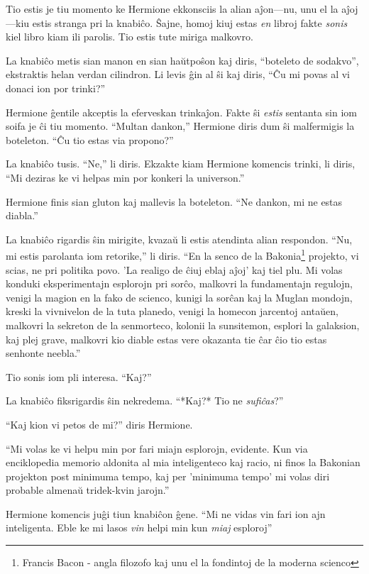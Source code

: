 Tio estis je tiu momento ke Hermione ekkonsciis la alian aĵon—nu, unu
el la aĵoj—kiu estis stranga pri la knabiĉo. Ŝajne, homoj kiuj estas
\emph{en} libroj fakte \emph{sonis} kiel libro kiam ili parolis. Tio
estis tute miriga malkovro.

La knabiĉo metis sian manon en sian haŭtpoŝon kaj diris, ``boteleto de
sodakvo'', ekstraktis helan verdan cilindron. Li levis ĝin al ŝi kaj
diris, ``Ĉu mi povas al vi donaci ion por trinki?''

Hermione ĝentile akceptis la eferveskan trinkaĵon. Fakte ŝi
\emph{estis} sentanta sin iom soifa je ĉi tiu momento. ``Multan
dankon,'' Hermione diris dum ŝi malfermigis la boteleton. ``Ĉu tio
estas via propono?''

La knabiĉo tusis. ``Ne,'' li diris. Ekzakte kiam Hermione komencis
trinki, li diris, ``Mi deziras ke vi helpas min por konkeri la
universon.''

Hermione finis sian gluton kaj mallevis la boteleton. ``Ne dankon, mi
ne estas diabla.''

La knabiĉo rigardis ŝin mirigite, kvazaŭ li estis atendinta alian
respondon. ``Nu, mi estis parolanta iom retorike,'' li diris. ``En la
senco de la Bakonia\footnote{Francis Bacon - angla filozofo kaj unu el
  la fondintoj de la moderna scienco} projekto, vi scias, ne pri
politika povo. 'La realigo de ĉiuj eblaj aĵoj' kaj tiel plu. Mi volas
konduki eksperimentajn esplorojn pri sorĉo, malkovri la fundamentajn
regulojn, venigi la magion en la fako de scienco, kunigi la sorĉan kaj
la Muglan mondojn, kreski la vivnivelon de la tuta planedo, venigi la
homecon jarcentoj antaŭen, malkovri la sekreton de la senmorteco,
kolonii la sunsitemon, esplori la galaksion, kaj plej grave, malkovri
kio diable estas vere okazanta tie ĉar ĉio tio estas senhonte
neebla.''

Tio sonis iom pli interesa. ``Kaj?''

La knabiĉo fiksrigardis ŝin nekredema. ``*Kaj?* Tio ne \emph{sufiĉas}?''

``Kaj kion vi petos de mi?'' diris Hermione.

``Mi volas ke vi helpu min por fari miajn esplorojn, evidente. Kun via
enciklopedia memorio aldonita al mia inteligenteco kaj racio, ni finos
la Bakonian projekton post minimuma tempo, kaj per 'minimuma tempo' mi
volas diri probable almenaŭ tridek-kvin jarojn.''

Hermione komencis juĝi tiun knabiĉon ĝene. ``Mi ne vidas vin fari ion
ajn inteligenta. Eble ke mi lasos \emph{vin} helpi min kun \emph{miaj}
esploroj''

